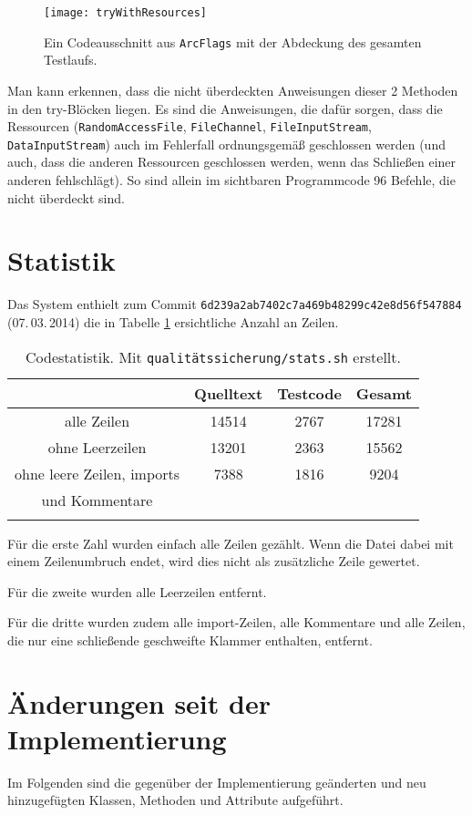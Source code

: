 \documentclass[a4paper, 11pt]{article}
\newcommand{\code}[1]{\texttt{#1}}
\begin{document}
\begin{figure}[H]
\texttt{[image: tryWithResources]}
\caption{Ein Codeausschnitt aus \code{ArcFlags} mit der Abdeckung des gesamten Testlaufs.}
\label{fig:tryWithResources}
\end{figure}

Man kann erkennen, dass die nicht überdeckten Anweisungen dieser 2 Methoden in den try-Blöcken liegen.
Es sind die Anweisungen, die dafür sorgen, dass die Ressourcen 
(\code{RandomAccessFile}, \code{FileChannel}, \code{FileInputStream}, \code{DataInputStream}) 
auch im Fehlerfall ordnungsgemäß geschlossen werden
(und auch, dass die anderen Ressourcen geschlossen werden,
wenn das Schließen einer anderen fehlschlägt).
So sind allein im sichtbaren Programmcode 96 Befehle, die nicht überdeckt sind.

\section{Statistik}
Das System enthielt zum Commit \code{6d239a2ab7402c7a469b48299c42e8d56f547884} (07.\,03.\,2014) die in Tabelle \ref{tab:codestat} ersichtliche Anzahl an Zeilen.\\
\begin{longtable}{||c|c|c||c||}
 & Quelltext & Testcode & Gesamt\\ \hline\hline
alle Zeilen & 14514 & 2767 & 17281\\ \hline
ohne Leerzeilen & 13201 & 2363 & 15562\\ \hline \hline
ohne leere Zeilen, imports& 7388 & 1816 & 9204\\
 und Kommentare &&& \\\hline
\caption{Codestatistik. Mit \code{qualitätssicherung/stats.sh} erstellt.}
\label{tab:codestat}
\end{longtable}

Für die erste Zahl wurden einfach alle Zeilen gezählt. Wenn die Datei dabei mit einem Zeilenumbruch endet, wird dies nicht als zusätzliche Zeile gewertet.

Für die zweite wurden alle Leerzeilen entfernt.

Für die dritte wurden zudem alle import-Zeilen, alle Kommentare und alle Zeilen, die nur eine schließende geschweifte Klammer enthalten, entfernt.

\section{Änderungen seit der Implementierung}
Im Folgenden sind die gegenüber der Implementierung geänderten und neu hinzugefügten Klassen, Methoden und Attribute aufgeführt.
\end{document}
